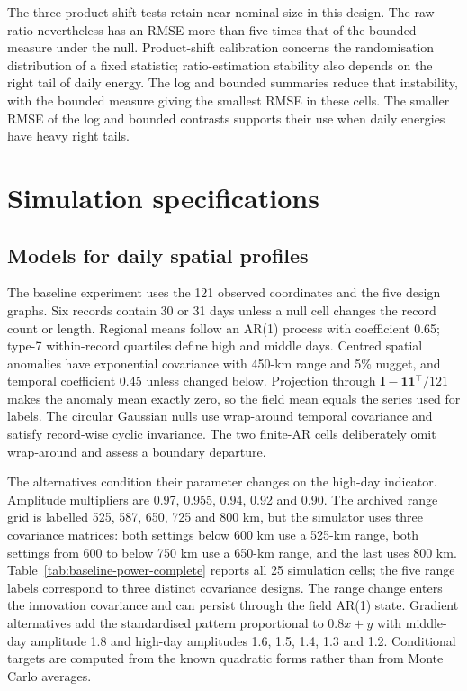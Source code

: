 \documentclass[namedate,webpdf,modern,mediumone]{oup-authoring-template}
\theoremstyle{thmstyleone}
\begin{document}
The three product-shift tests retain near-nominal size in this design. The raw
ratio nevertheless has an RMSE more than five times that of the bounded
measure under the null. Product-shift calibration concerns the randomisation
distribution of a fixed statistic; ratio-estimation stability also depends on
the right tail of daily energy. The log and bounded summaries reduce that instability,
with the bounded measure giving the smallest RMSE in these cells. The smaller RMSE of the log and bounded contrasts supports their use
when daily energies have heavy right tails.

\section{Simulation specifications}
\label{sec:complete-simulations}

\subsection{Models for daily spatial profiles}
\label{sec:baseline-day-simulation}

The baseline experiment uses the 121 observed coordinates and the five design
graphs. Six records contain 30 or 31 days unless a null cell changes the
record count or length. Regional means follow an AR(1) process with coefficient
0.65; type-7 within-record quartiles define high and middle days. Centred
spatial anomalies have exponential covariance with 450-km range and 5\%
nugget, and temporal coefficient 0.45 unless changed below. Projection through
$\mathbf I-\mathbf1\mathbf1^\top/121$ makes the anomaly mean exactly zero, so
the field mean equals the series used for labels. The circular Gaussian nulls
use wrap-around temporal covariance and satisfy record-wise cyclic invariance.
The two finite-AR cells deliberately omit wrap-around and assess a boundary
departure.

The alternatives condition their parameter changes on the high-day indicator.
Amplitude multipliers are 0.97, 0.955, 0.94, 0.92 and 0.90. The archived range
grid is labelled 525, 587, 650, 725 and 800 km, but the simulator uses three
covariance matrices: both settings below 600 km use a 525-km range, both
settings from 600 to below 750 km use a 650-km range, and the last uses 800 km.
Table~\ref{tab:baseline-power-complete} reports all 25 simulation cells;
the five range labels correspond to three distinct covariance designs. The range
change enters the innovation covariance and can persist through the field
AR(1) state. Gradient alternatives add the standardised pattern proportional
to $0.8x+y$ with middle-day amplitude 1.8 and high-day amplitudes 1.6, 1.5,
1.4, 1.3 and 1.2. Conditional targets are computed from the known quadratic
forms rather than from Monte Carlo averages.
\end{document}
